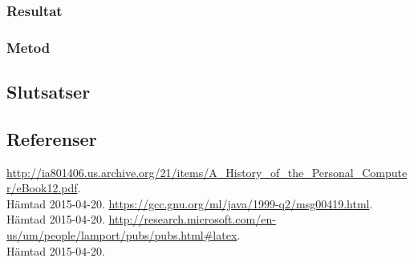 \subsubsection{Resultat}
\subsubsection{Metod}
\subsection{Slutsatser}
\subsection{Referenser}
\begin{thebibliography}{9}
\url{http://ia801406.us.archive.org/21/items/A\_History\_of\_the\_Personal\_Computer/eBook12.pdf}.\\
 Hämtad 2015-04-20.
\url{https://gcc.gnu.org/ml/java/1999-q2/msg00419.html}.\\
 Hämtad 2015-04-20.
\url{http://research.microsoft.com/en-us/um/people/lamport/pubs/pubs.html\#latex}.\\
 Hämtad 2015-04-20.
 
\end{thebibliography}